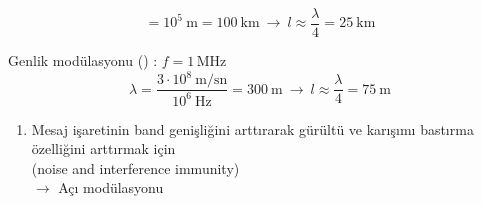 \documentclass[11pt,a4paper]{article}
\begin{document}
\[
=10^5\ \mathrm{m}=100\ \mathrm{km}\ \rightarrow\ l\approx\frac{\lambda}{4}=25\ \mathrm{km}
\]

Genlik modülasyonu () : $f=1\,\mathrm{MHz}$
\[
\lambda=\frac{3\cdot10^8\ \mathrm{m/sn}}{10^6\ \mathrm{Hz}}=300\ \mathrm{m}\ \rightarrow\ l\approx\frac{\lambda}{4}=75\ \mathrm{m}
\]

\begin{enumerate}[label=\arabic*),start=3]
\item Mesaj işaretinin band genişliğini arttırarak gürültü ve karışımı bastırma özelliğini arttırmak için\\
(noise and interference immunity)\\
$\rightarrow$ Açı modülasyonu
\end{enumerate}
\end{document}
